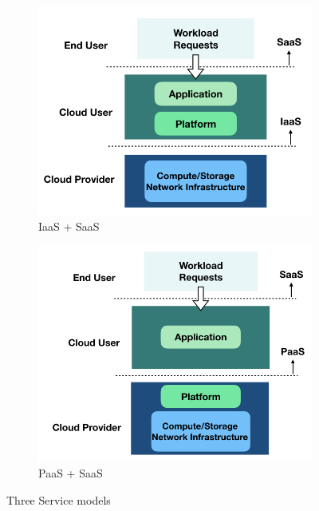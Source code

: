 \begin{figure}[H]
	\centering
	\begin{subfigure}[b]{0.45\textwidth}
		\includegraphics[width=\textwidth]{pics/iaas.png}
		\caption{IaaS + SaaS}
	\end{subfigure}
	\begin{subfigure}[b]{0.45\textwidth}
		\includegraphics[width=\textwidth]{pics/paas.png}
	\caption{PaaS + SaaS}
	\end{subfigure}
	\caption{Three Service models \cite{Jennings:2015ht}}
	\label{fig:service_models}
\end{figure}

